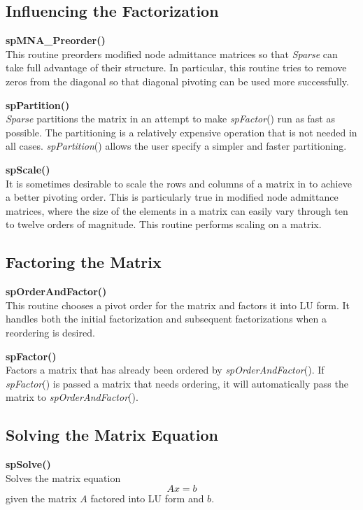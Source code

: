 \documentclass[11pt]{article}
\begin{document}
\subsection{Influencing the Factorization}

{\bf spMNA\_Preorder()}\\
This routine preorders modified node admittance matrices so that
\emph{Sparse} can take full advantage of their structure.  In
particular, this routine tries to remove zeros from the diagonal so
that diagonal pivoting can be used more successfully.

{\bf spPartition()}\\
\emph{Sparse} partitions the matrix in an attempt to make \emph{spFactor}()
run as fast as possible.  The partitioning is a relatively expensive
operation that is not needed in all cases.  \emph{spPartition}() allows
the user specify a simpler and faster partitioning.

{\bf spScale()}\\
It is sometimes desirable to scale the rows and columns of a matrix in
to achieve a better pivoting order.  This is particularly true in
modified node admittance matrices, where the size of the elements in a
matrix can easily vary through ten to twelve orders of magnitude.  This
routine performs scaling on a matrix.


\subsection{Factoring the Matrix}

{\bf spOrderAndFactor()}\\
This routine chooses a pivot order for the matrix and factors it into
LU form.  It handles both the initial factorization and subsequent
factorizations when a reordering is desired.

{\bf spFactor()}\\
Factors a matrix that has already been ordered by \emph{spOrderAndFactor}().
If \emph{spFactor}() is passed a matrix that needs ordering, it will
automatically pass the matrix to \emph{spOrderAndFactor}().

\subsection{Solving the Matrix Equation}

{\bf spSolve()}\\
Solves the matrix equation
\begin{equation}
A x = b
\end{equation}
given the matrix $A$ factored into LU form and $b$.
\end{document}

